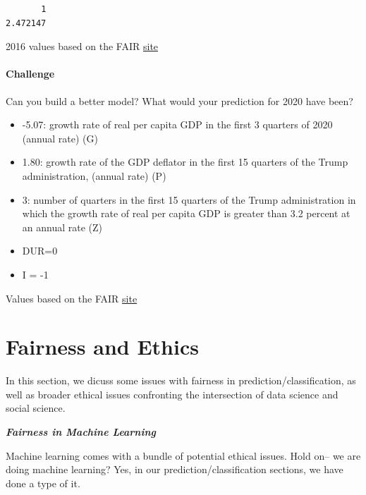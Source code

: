 \documentclass[
  letterpaper,
  DIV=11,
  numbers=noendperiod]{scrreprt}
\providecommand{\tightlist}{%
  \setlength{\itemsep}{0pt}\setlength{\parskip}{0pt}}\usepackage{longtable,booktabs,array}
\begin{document}
\begin{verbatim}
       1 
2.472147 
\end{verbatim}

2016 values based on the FAIR
\href{https://fairmodel.econ.yale.edu/vote2016/index2.htm}{site}

\hypertarget{challenge}{%
\subsubsection{Challenge}\label{challenge}}

Can you build a better model? What would your prediction for 2020 have
been?

\begin{itemize}
\tightlist
\item
  -5.07: growth rate of real per capita GDP in the first 3 quarters of
  2020 (annual rate) (G)
\item
  1.80: growth rate of the GDP deflator in the first 15 quarters of the
  Trump administration, (annual rate) (P)
\item
  3: number of quarters in the first 15 quarters of the Trump
  administration in which the growth rate of real per capita GDP is
  greater than 3.2 percent at an annual rate (Z)
\item
  DUR=0
\item
  I = -1
\end{itemize}

Values based on the FAIR
\href{https://fairmodel.econ.yale.edu/vote2020/computev.htm}{site}


\hypertarget{fairness}{%
\chapter{Fairness and Ethics}\label{fairness}}

In this section, we dicuss some issues with fairness in
prediction/classification, as well as broader ethical issues confronting
the intersection of data science and social science.

\textbf{\emph{Fairness in Machine Learning}}

Machine learning comes with a bundle of potential ethical issues. Hold
on-- we are doing machine learning? Yes, in our
prediction/classification sections, we have done a type of it.
\end{document}
